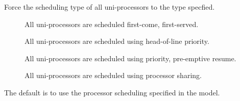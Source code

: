 \begin{description}
Force the scheduling type of all uni-processors to the type specfied.
\begin{description}
\item[]
All uni-processors are scheduled first-come, first-served.
\item[]
All uni-processors are scheduled using head-of-line priority.
\item[]
All uni-processors are scheduled using priority, pre-emptive resume.
\item[]
All uni-processors are scheduled using processor sharing.
\end{description}
The default is to use the processor scheduling specified in the model.


\end{description}
